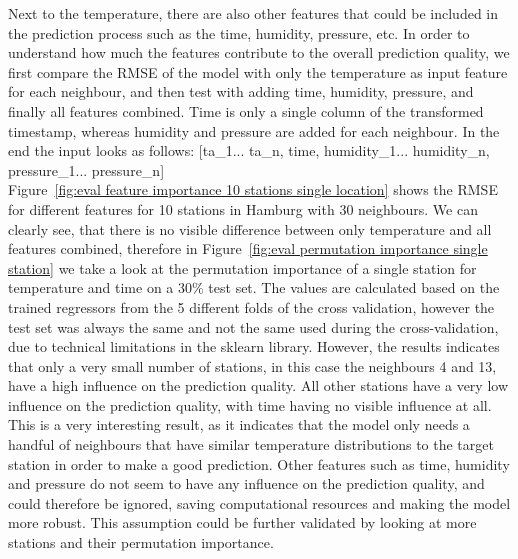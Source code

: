Next to the temperature, there are also other features that could be included in the prediction process such as the time, humidity, pressure, etc. In order to understand how much the features contribute to the overall prediction quality, we first compare the RMSE of the model with only the temperature as input feature for each neighbour, and then test with adding time, humidity, pressure, and finally all features combined. Time is only a single column of the transformed timestamp, whereas humidity and pressure are added for each neighbour. In the end the input looks as follows: [ta\_1... ta\_n, time, humidity\_1... humidity\_n, pressure\_1... pressure\_n]\\
Figure~\ref{fig:eval feature importance 10 stations single location} shows the RMSE for different features for 10 stations in Hamburg with 30 neighbours. We can clearly see, that there is no visible difference between only temperature and all features combined, therefore in Figure~\ref{fig:eval permutation importance single station} we take a look at the permutation importance of a single station for temperature and time on a 30\% test set. The values are calculated based on the trained regressors from the 5 different folds of the cross validation, however the test set was always the same and not the same used during the cross-validation, due to technical limitations in the sklearn library. However, the results indicates that only a very small number of stations, in this case the neighbours 4 and 13, have a high influence on the prediction quality. All other stations have a very low influence on the prediction quality, with time having no visible influence at all. This is a very interesting result, as it indicates that the model only needs a handful of neighbours that have similar temperature distributions to the target station in order to make a good prediction. Other features such as time, humidity and pressure do not seem to have any influence on the prediction quality, and could therefore be ignored, saving computational resources and making the model more robust. This assumption could be further validated by looking at more stations and their permutation importance.\\ 

